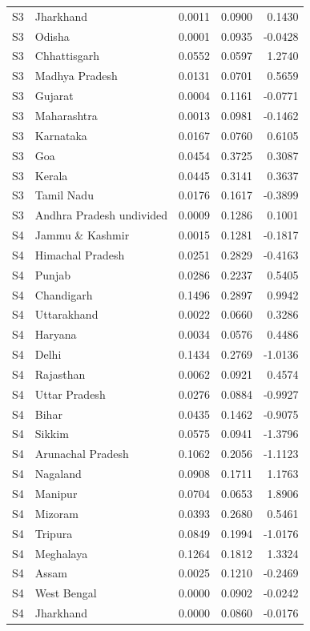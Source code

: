 \documentclass[11pt,a4paper]{report}
\begin{document}
\begin{longtable}{l>{\raggedright\arraybackslash}p{5cm}rrr}
S3 & Jharkhand & 0.0011 & 0.0900 & 0.1430 \\
S3 & Odisha & 0.0001 & 0.0935 & -0.0428 \\
S3 & Chhattisgarh & 0.0552 & 0.0597 & 1.2740 \\
S3 & Madhya Pradesh & 0.0131 & 0.0701 & 0.5659 \\
S3 & Gujarat & 0.0004 & 0.1161 & -0.0771 \\
S3 & Maharashtra & 0.0013 & 0.0981 & -0.1462 \\
S3 & Karnataka & 0.0167 & 0.0760 & 0.6105 \\
S3 & Goa & 0.0454 & 0.3725 & 0.3087 \\
S3 & Kerala & 0.0445 & 0.3141 & 0.3637 \\
S3 & Tamil Nadu & 0.0176 & 0.1617 & -0.3899 \\
S3 & Andhra Pradesh undivided & 0.0009 & 0.1286 & 0.1001 \\
S4 & Jammu \& Kashmir & 0.0015 & 0.1281 & -0.1817 \\
S4 & Himachal Pradesh & 0.0251 & 0.2829 & -0.4163 \\
S4 & Punjab & 0.0286 & 0.2237 & 0.5405 \\
S4 & Chandigarh & 0.1496 & 0.2897 & 0.9942 \\
S4 & Uttarakhand & 0.0022 & 0.0660 & 0.3286 \\
S4 & Haryana & 0.0034 & 0.0576 & 0.4486 \\
S4 & Delhi & 0.1434 & 0.2769 & -1.0136 \\
S4 & Rajasthan & 0.0062 & 0.0921 & 0.4574 \\
S4 & Uttar Pradesh & 0.0276 & 0.0884 & -0.9927 \\
S4 & Bihar & 0.0435 & 0.1462 & -0.9075 \\
S4 & Sikkim & 0.0575 & 0.0941 & -1.3796 \\
S4 & Arunachal Pradesh & 0.1062 & 0.2056 & -1.1123 \\
S4 & Nagaland & 0.0908 & 0.1711 & 1.1763 \\
S4 & Manipur & 0.0704 & 0.0653 & 1.8906 \\
S4 & Mizoram & 0.0393 & 0.2680 & 0.5461 \\
S4 & Tripura & 0.0849 & 0.1994 & -1.0176 \\
S4 & Meghalaya & 0.1264 & 0.1812 & 1.3324 \\
S4 & Assam & 0.0025 & 0.1210 & -0.2469 \\
S4 & West Bengal & 0.0000 & 0.0902 & -0.0242 \\
S4 & Jharkhand & 0.0000 & 0.0860 & -0.0176 \\

\end{longtable}
\end{document}
